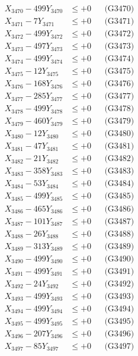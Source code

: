 \documentclass[a4paper,10pt]{article}
\begin{document}
{\begin{align}
X_{3470} - 499Y_{3470} &\leq +0 && \text{(G3470)} \\
\allowbreak
X_{3471} - 7Y_{3471} &\leq +0 && \text{(G3471)} \\
X_{3472} - 499Y_{3472} &\leq +0 && \text{(G3472)} \\
X_{3473} - 497Y_{3473} &\leq +0 && \text{(G3473)} \\
X_{3474} - 499Y_{3474} &\leq +0 && \text{(G3474)} \\
X_{3475} - 12Y_{3475} &\leq +0 && \text{(G3475)} \\
X_{3476} - 168Y_{3476} &\leq +0 && \text{(G3476)} \\
X_{3477} - 285Y_{3477} &\leq +0 && \text{(G3477)} \\
X_{3478} - 499Y_{3478} &\leq +0 && \text{(G3478)} \\
X_{3479} - 460Y_{3479} &\leq +0 && \text{(G3479)} \\
X_{3480} - 12Y_{3480} &\leq +0 && \text{(G3480)} \\
\allowbreak
X_{3481} - 47Y_{3481} &\leq +0 && \text{(G3481)} \\
X_{3482} - 21Y_{3482} &\leq +0 && \text{(G3482)} \\
X_{3483} - 358Y_{3483} &\leq +0 && \text{(G3483)} \\
X_{3484} - 53Y_{3484} &\leq +0 && \text{(G3484)} \\
X_{3485} - 499Y_{3485} &\leq +0 && \text{(G3485)} \\
X_{3486} - 465Y_{3486} &\leq +0 && \text{(G3486)} \\
X_{3487} - 101Y_{3487} &\leq +0 && \text{(G3487)} \\
X_{3488} - 26Y_{3488} &\leq +0 && \text{(G3488)} \\
X_{3489} - 313Y_{3489} &\leq +0 && \text{(G3489)} \\
X_{3490} - 499Y_{3490} &\leq +0 && \text{(G3490)} \\
\allowbreak
X_{3491} - 499Y_{3491} &\leq +0 && \text{(G3491)} \\
X_{3492} - 24Y_{3492} &\leq +0 && \text{(G3492)} \\
X_{3493} - 499Y_{3493} &\leq +0 && \text{(G3493)} \\
X_{3494} - 499Y_{3494} &\leq +0 && \text{(G3494)} \\
X_{3495} - 499Y_{3495} &\leq +0 && \text{(G3495)} \\
X_{3496} - 207Y_{3496} &\leq +0 && \text{(G3496)} \\
X_{3497} - 85Y_{3497} &\leq +0 && \text{(G3497)} \\

\end{align}}
\end{document}
